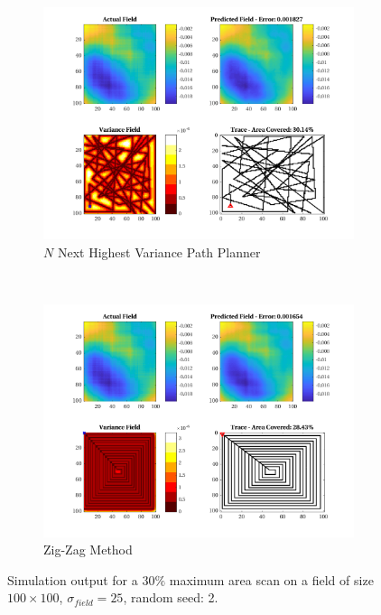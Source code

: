 \begin{figure}[htb!]
\begin{subfigure}[t]{0.5\textwidth}
    \end{subfigure}%
    \\
    \begin{subfigure}[t]{0.5\textwidth}
        \centering
        \includegraphics[width=\linewidth]{figures/hbresults/nnhv_30p_100x100_sf_25_seed_2.png}
        \captionsetup{skip=0.10\baselineskip,size=footnotesize}
        \caption{$N$ Next Highest Variance Path Planner}
    \end{subfigure}%
    ~
    \begin{subfigure}[t]{0.5\textwidth}
        \centering
        \includegraphics[width=\linewidth]{figures/hbresults/zz_30p_100x100_sf_25_seed_2.png}
        \captionsetup{skip=0.10\baselineskip,size=footnotesize}
        \caption{Zig-Zag Method}
    \end{subfigure}%
    \captionsetup{skip=0.20\baselineskip}
    \caption{Simulation output for a $30\%$ maximum area scan on a field of size $100 \times 100$, $\sigma_{field} = 25$, random seed: 2.}
    \label{fig:sim_sigma25_p30_s2}
\end{figure}

